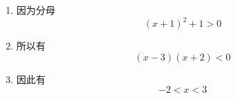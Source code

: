 \begin{questions}
\begin{enumerate}[label=(\arabic*)]
\begin{solution}
\begin{enumerate}[label=\protect\circled{\arabic*}]
				      \item 因为分母
				            \begin{equation*}
					            (x+1)^2 + 1 > 0
				            \end{equation*}

				      \item 所以有
				            \begin{equation*}
					            (x-3)(x+2) < 0
				            \end{equation*}

				      \item 因此有
				            \begin{equation*}
					            -2 < x < 3
				            \end{equation*}
			      \end{enumerate}
		      \end{solution}


\end{enumerate}
\end{questions}
